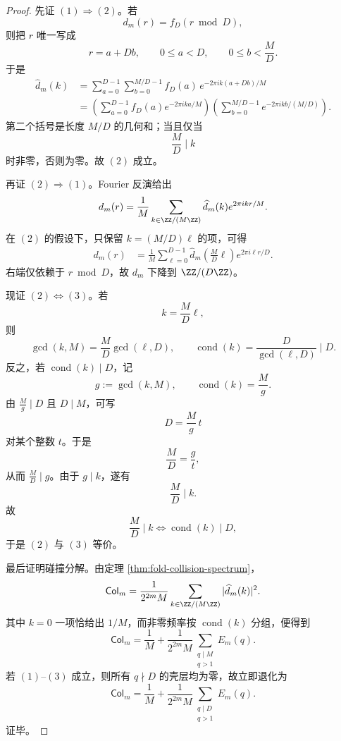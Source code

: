 \begin{proof}
先证 \((1)\Rightarrow(2)\)。若
\[
d_m(r)=f_D(r\bmod D),
\]
则把 \(r\) 唯一写成
\[
r=a+Db,
\qquad
0\le a<D,
\qquad
0\le b<\frac{M}{D}.
\]
于是
\[
\begin{aligned}
\widehat d_m(k)
&=
\sum_{a=0}^{D-1}\sum_{b=0}^{M/D-1}
f_D(a)\,e^{-2\pi i k(a+Db)/M}\\
&=
\left(\sum_{a=0}^{D-1}f_D(a)e^{-2\pi i ka/M}\right)
\left(\sum_{b=0}^{M/D-1}e^{-2\pi i kb/(M/D)}\right).
\end{aligned}
\]
第二个括号是长度 \(M/D\) 的几何和；当且仅当
\[
\frac{M}{D}\mid k
\]
时非零，否则为零。故 \((2)\) 成立。

再证 \((2)\Rightarrow(1)\)。Fourier 反演给出
\[
d_m(r)=\frac1M\sum_{k\in\ZZ/(M\ZZ)}\widehat d_m(k)e^{2\pi i kr/M}.
\]
在 \((2)\) 的假设下，只保留 \(k=(M/D)\ell\) 的项，可得
\[
\begin{aligned}
d_m(r)
&=
\frac1M\sum_{\ell=0}^{D-1}\widehat d_m\!\left(\frac{M}{D}\ell\right)
e^{2\pi i \ell r/D}.
\end{aligned}
\]
右端仅依赖于 \(r\bmod D\)，故 \(d_m\) 下降到 \(\ZZ/(D\ZZ)\)。

现证 \((2)\Leftrightarrow(3)\)。若
\[
k=\frac{M}{D}\ell,
\]
则
\[
\gcd(k,M)=\frac{M}{D}\gcd(\ell,D),
\qquad
\operatorname{cond}(k)=\frac{D}{\gcd(\ell,D)}\mid D.
\]
反之，若 \(\operatorname{cond}(k)\mid D\)，记
\[
g:=\gcd(k,M),
\qquad
\operatorname{cond}(k)=\frac{M}{g}.
\]
由 \(\frac{M}{g}\mid D\) 且 \(D\mid M\)，可写
\[
D=\frac{M}{g}\,t
\]
对某个整数 \(t\)。于是
\[
\frac{M}{D}=\frac{g}{t},
\]
从而 \(\frac{M}{D}\mid g\)。由于 \(g\mid k\)，遂有
\[
\frac{M}{D}\mid k.
\]
故
\[
\frac{M}{D}\mid k
\iff
\operatorname{cond}(k)\mid D,
\]
于是 \((2)\) 与 \((3)\) 等价。

最后证明碰撞分解。由定理 \ref{thm:fold-collision-spectrum}，
\[
\mathsf{Col}_m
=
\frac{1}{2^{2m}M}\sum_{k\in\ZZ/(M\ZZ)}|\widehat d_m(k)|^2.
\]
其中 \(k=0\) 一项恰给出 \(1/M\)，而非零频率按 \(\operatorname{cond}(k)\) 分组，便得到
\[
\mathsf{Col}_m
=
\frac1M+\frac{1}{2^{2m}M}\sum_{\substack{q\mid M\\ q>1}}E_m(q).
\]
若 \((1)\)--\((3)\) 成立，则所有 \(q\nmid D\) 的壳层均为零，故立即退化为
\[
\mathsf{Col}_m
=
\frac1M+\frac{1}{2^{2m}M}\sum_{\substack{q\mid D\\ q>1}}E_m(q).
\]
证毕。
\end{proof}

